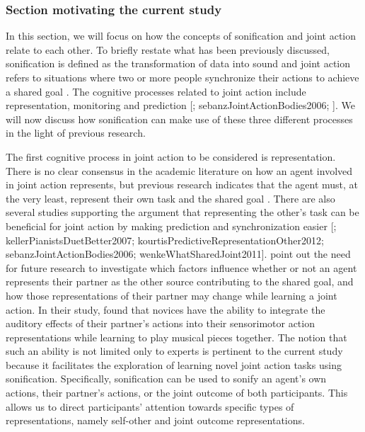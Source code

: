 \documentclass[10pt,a4paper,onecolumn]{article}
\begin{document}
\hypertarget{section-motivating-the-current-study}{%
\subsubsection{Section motivating the current study}\label{section-motivating-the-current-study}}

In this section, we will focus on how the concepts of sonification and joint action relate to each other. To briefly restate what has been previously discussed, sonification is defined as the transformation of data into sound \autocite{kramerSonificationReportStatus1999} and joint action refers to situations where two or more people synchronize their actions to achieve a shared goal \autocite{knoblichPsychologicalResearchJoint2011}. The cognitive processes related to joint action include representation, monitoring and prediction {[}\textcite{loehrMonitoringIndividualJoint2013}; sebanzJointActionBodies2006; \textcite{vesperMinimalArchitectureJoint2010}{]}. We will now discuss how sonification can make use of these three different processes in the light of previous research.

The first cognitive process in joint action to be considered is representation. There is no clear consensus in the academic literature on how an agent involved in joint action represents, but previous research indicates that the agent must, at the very least, represent their own task and the shared goal \autocite{vesperMinimalArchitectureJoint2010}. There are also several studies supporting the argument that representing the other's task can be beneficial for joint action by making prediction and synchronization easier {[}\textcite{boltSensoryAttenuationAuditory2021}; kellerPianistsDuetBetter2007; kourtisPredictiveRepresentationOther2012; sebanzJointActionBodies2006; wenkeWhatSharedJoint2011{]}. \textcite{loehrSoundYouMe2016} point out the need for future research to investigate which factors influence whether or not an agent represents their partner as the other source contributing to the shared goal, and how those representations of their partner may change while learning a joint action. In their study, \textcite{loehrSoundYouMe2016} found that novices have the ability to integrate the auditory effects of their partner's actions into their sensorimotor action representations while learning to play musical pieces together. The notion that such an ability is not limited only to experts is pertinent to the current study because it facilitates the exploration of learning novel joint action tasks using sonification. Specifically, sonification can be used to sonify an agent's own actions, their partner's actions, or the joint outcome of both participants. This allows us to direct participants' attention towards specific types of representations, namely self-other and joint outcome representations.
\end{document}
